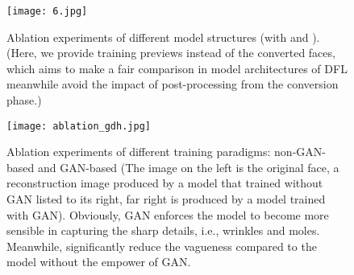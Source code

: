 \documentclass[10pt,twocolumn,letterpaper]{article}
\begin{document}
\begin{figure}[h]
	\begin{center}
		\texttt{[image: 6.jpg]}
	\end{center}
	\caption{Ablation experiments of different model structures (with  and ). (Here, we provide training previews instead of the converted faces, which aims to make a fair comparison in model architectures of DFL meanwhile avoid the impact of post-processing from the conversion phase.)}
	\label{fig:long51}
	\label{fig:onecol51}
\end{figure}


\begin{figure}[htpb]
	\begin{center}
		\texttt{[image: ablation\_gdh.jpg]}
	\end{center}
	\caption{Ablation experiments of different training paradigms: non-GAN-based and GAN-based (The image on the left is the original face, a reconstruction image produced by a model that trained without GAN listed to its right, far right is produced by a model trained with GAN). Obviously, GAN enforces the model to become more sensible in capturing the sharp details, i.e., wrinkles and moles. Meanwhile, significantly reduce the vagueness compared to the model without the empower of GAN.}
	\label{fig:long52}
	\label{fig:onecol52}
\end{figure}


\begin{table*}[htbp]
	\caption{Quantitative ablation results on FaceForensics++ ~\cite{faceforensics} face images.}
	\label{tab:booktabs2}
	\centering
\end{table*}
\end{document}
